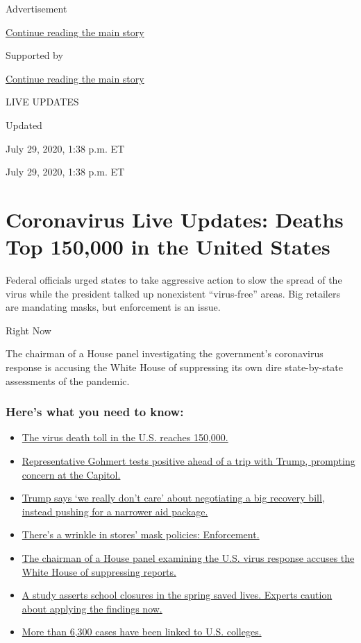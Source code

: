 Advertisement

\protect\hyperlink{after-top}{Continue reading the main story}

Supported by

\protect\hyperlink{after-sponsor}{Continue reading the main story}

LIVE UPDATES

Updated~

July 29, 2020, 1:38 p.m. ET

July 29, 2020, 1:38 p.m. ET

\hypertarget{coronavirus-live-updates-deaths-top-150000-in-the-united-states}{%
\section{Coronavirus Live Updates: Deaths Top 150,000 in the United
States}\label{coronavirus-live-updates-deaths-top-150000-in-the-united-states}}

Federal officials urged states to take aggressive action to slow the
spread of the virus while the president talked up nonexistent
``virus-free'' areas. Big retailers are mandating masks, but enforcement
is an issue.

Right Now

The chairman of a House panel investigating the government's coronavirus
response is accusing the White House of suppressing its own dire
state-by-state assessments of the pandemic.

\hypertarget{heres-what-you-need-to-know}{%
\subsubsection{Here's what you need to
know:}\label{heres-what-you-need-to-know}}

\begin{itemize}
\tightlist
\item
  \protect\hyperlink{link-1fc03c4a}{The virus death toll in the U.S.
  reaches 150,000.}
\item
  \protect\hyperlink{link-662712eb}{Representative Gohmert tests
  positive ahead of a trip with Trump, prompting concern at the
  Capitol.}
\item
  \protect\hyperlink{link-73760ee2}{Trump says `we really don't care'
  about negotiating a big recovery bill, instead pushing for a narrower
  aid package.}
\item
  \protect\hyperlink{link-531300e7}{There's a wrinkle in stores' mask
  policies: Enforcement.}
\item
  \protect\hyperlink{link-43ec24d5}{The chairman of a House panel
  examining the U.S. virus response accuses the White House of
  suppressing reports.}
\item
  \protect\hyperlink{link-69d86eaf}{A study asserts school closures in
  the spring saved lives. Experts caution about applying the findings
  now.}
\item
  \protect\hyperlink{link-4a99ca45}{More than 6,300 cases have been
  linked to U.S. colleges.}
\end{itemize}

